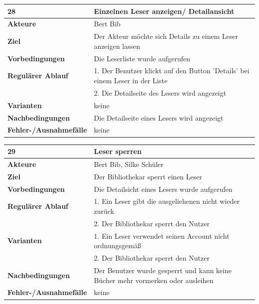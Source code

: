 \documentclass[fontsize=12pt,paper=a4,twoside]{scrartcl}
\begin{document}
\begin{table}[htbp]
\label{28}
\begin{tabular}{|l|p{10cm}|}
\hline 
\textbf{28} & \textbf{Einzelnen Leser anzeigen/ Detailansicht} \\ \hline
\textbf{Akteure} & Bert Bib\\ \hline
\textbf{Ziel} & Der Akteur möchte sich Details zu einem Leser anzeigen lassen \\ \hline
\textbf{Vorbedingungen} & Die Leserliste wurde aufgerufen \\ \hline
\textbf{Regulärer Ablauf} & 
1. Der Benutzer klickt auf den Button 'Details' bei einem Leser in der Liste \\
&2. Die Detailseite des Lesers wird angezeigt\\
\hline
\textbf{Varianten} & 
keine \\ \hline
\textbf{Nachbedingungen} & Die Detailseite eines Lesers wird angezeigt\\ \hline
\textbf{Fehler-/Ausnahmefälle} & keine\\
\hline
\end{tabular}
\end{table}

\begin{table}[htbp]
\label{29}
\begin{tabular}{|l|p{10cm}|}
\hline 
\textbf{29} & \textbf{Leser sperren} \\ \hline
\textbf{Akteure} & Bert Bib, Silke Schüler\\ \hline
\textbf{Ziel} & Der Bibliothekar sperrt einen Leser \\ \hline
\textbf{Vorbedingungen} & Die Detailsicht eines Lesers wurde aufgerufen \\ \hline
\textbf{Regulärer Ablauf} & 
1. Ein Leser gibt die ausgeliehenen nicht wieder zurück\\
&2. Der Bibliothekar sperrt den Nutzer\\
\hline
\textbf{Varianten} & 
1. Ein Leser verwendet seinen Account nicht ordnungsgemäß\\
&2. Der Bibliothekar sperrt den Nutzer\\ \hline
\textbf{Nachbedingungen} & Der Benutzer wurde gesperrt und kann keine Bücher mehr vormerken oder 
ausleihen\\ \hline
\textbf{Fehler-/Ausnahmefälle} & keine\\
\hline
\end{tabular}
\end{table}
\end{document}
